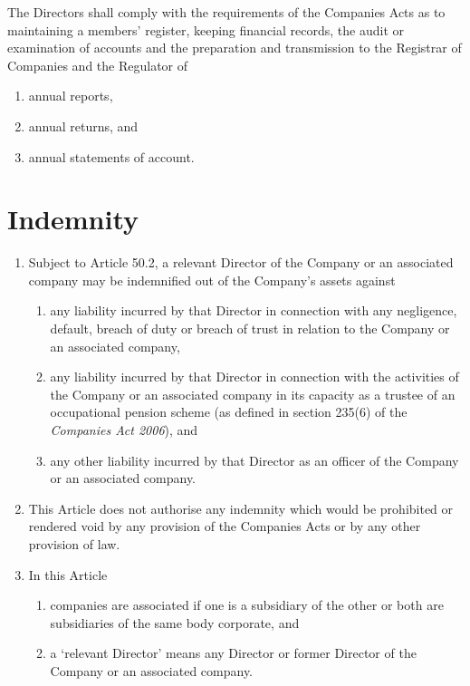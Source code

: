 \documentclass[a4paper,12pt]{article}
\renewcommand{\labelenumii}{(\alph{enumii})}
\begin{document}
The Directors shall comply with the requirements of the Companies Acts as to maintaining a members' register, keeping financial records, the audit or examination of accounts and the preparation and transmission to the Registrar of Companies and the Regulator of

\begin{enumerate}
  \item annual reports,
  \item annual returns, and
  \item annual statements of account.
\end{enumerate}

\section{Indemnity}

\begin{enumerate}
  \item Subject to Article 50.2, a relevant Director of the Company or an associated company may be indemnified out of the Company's assets against
  \begin{enumerate}
    \renewcommand{\labelenumii}{(\alph{enumii})}
    \item any liability incurred by that Director in connection with any negligence, default, breach of duty or breach of trust in relation to the Company or an associated company,
    \item any liability incurred by that Director in connection with the activities of the Company or an associated company in its capacity as a trustee of an occupational pension scheme (as defined in section 235(6) of the \textit{Companies Act 2006}), and
    \item any other liability incurred by that Director as an officer of the Company or an associated company.
  \end{enumerate}
  \item This Article does not authorise any indemnity which would be prohibited or rendered void by any provision of the Companies Acts or by any other provision of law.
  \item In this Article
  \begin{enumerate}
    \item companies are associated if one is a subsidiary of the other or both are subsidiaries of the same body corporate, and
    \item a `relevant Director' means any Director or former Director of the Company or an associated company.
  \end{enumerate}
\end{enumerate}
\end{document}
